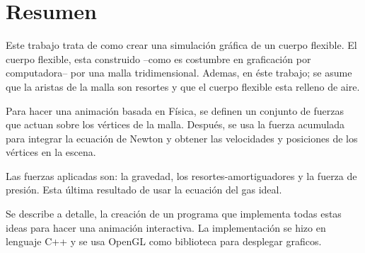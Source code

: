 \chapter*{Resumen}
Este trabajo trata de como crear una simulación gráfica de un cuerpo flexible.
El cuerpo flexible, esta construido --como es costumbre en graficación por computadora-- por una malla tridimensional. Ademas, en éste trabajo; se asume que la aristas de la malla son resortes y que el cuerpo flexible esta relleno de aire.

Para hacer una animación basada en Física, se definen un conjunto de fuerzas que actuan sobre los vértices de la malla. Después, se usa la fuerza acumulada para integrar la ecuación de Newton y obtener las velocidades y posiciones de los vértices en la escena.

Las fuerzas aplicadas son: la gravedad, los resortes-amortiguadores y la fuerza de presión. Esta última resultado de usar la ecuación del gas ideal.

Se describe a detalle, la creación de un programa que implementa todas estas ideas para hacer una animación interactiva. La implementación se hizo en lenguaje C++ y se usa OpenGL como biblioteca para desplegar graficos.
